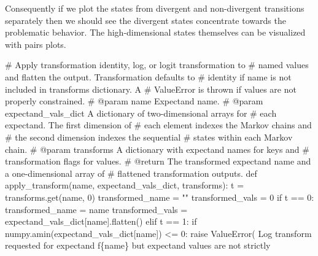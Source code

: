 \documentclass[
  letterpaper,
  DIV=11,
  numbers=noendperiod]{scrartcl}
\newenvironment{Shaded}{\begin{snugshade}}{\end{snugshade}}
\newcommand{\CommentTok}[1]{\textcolor[rgb]{0.37,0.37,0.37}{#1}}
\newcommand{\ControlFlowTok}[1]{\textcolor[rgb]{0.00,0.23,0.31}{#1}}
\newcommand{\DecValTok}[1]{\textcolor[rgb]{0.68,0.00,0.00}{#1}}
\newcommand{\KeywordTok}[1]{\textcolor[rgb]{0.00,0.23,0.31}{#1}}
\newcommand{\NormalTok}[1]{\textcolor[rgb]{0.00,0.23,0.31}{#1}}
\newcommand{\OperatorTok}[1]{\textcolor[rgb]{0.37,0.37,0.37}{#1}}
\newcommand{\PreprocessorTok}[1]{\textcolor[rgb]{0.68,0.00,0.00}{#1}}
\newcommand{\SpecialCharTok}[1]{\textcolor[rgb]{0.37,0.37,0.37}{#1}}
\newcommand{\SpecialStringTok}[1]{\textcolor[rgb]{0.13,0.47,0.30}{#1}}
\newcommand{\StringTok}[1]{\textcolor[rgb]{0.13,0.47,0.30}{#1}}
\begin{document}
Consequently if we plot the states from divergent and non-divergent
transitions separately then we should see the divergent states
concentrate towards the problematic behavior. The high-dimensional
states themselves can be visualized with pairs plots.

\begin{Shaded}
\begin{Highlighting}[]
\CommentTok{\# Apply transformation identity, log, or logit transformation to}
\CommentTok{\# named values and flatten the output.  Transformation defaults to}
\CommentTok{\# identity if name is not included in \textasciigrave{}transforms\textasciigrave{} dictionary.  A}
\CommentTok{\# ValueError is thrown if values are not properly constrained.}
\CommentTok{\# @param name Expectand name.}
\CommentTok{\# @param expectand\_vals\_dict A dictionary of two{-}dimensional arrays for}
\CommentTok{\#                            each expectand.  The first dimension of}
\CommentTok{\#                            each element indexes the Markov chains and}
\CommentTok{\#                            the second dimension indexes the sequential}
\CommentTok{\#                            states within each Markov chain.}
\CommentTok{\# @param transforms A dictionary with expectand names for keys and}
\CommentTok{\#                   transformation flags for values.}
\CommentTok{\# @return The transformed expectand name and a one{-}dimensional array of}
\CommentTok{\#         flattened transformation outputs.}
\KeywordTok{def}\NormalTok{ apply\_transform(name, expectand\_vals\_dict, transforms):}
\NormalTok{  t }\OperatorTok{=}\NormalTok{ transforms.get(name, }\DecValTok{0}\NormalTok{)}
\NormalTok{  transformed\_name }\OperatorTok{=} \StringTok{""}
\NormalTok{  transformed\_vals }\OperatorTok{=} \DecValTok{0}
  \ControlFlowTok{if}\NormalTok{ t }\OperatorTok{==} \DecValTok{0}\NormalTok{:}
\NormalTok{    transformed\_name }\OperatorTok{=}\NormalTok{ name}
\NormalTok{    transformed\_vals }\OperatorTok{=}\NormalTok{ expectand\_vals\_dict[name].flatten()}
  \ControlFlowTok{elif}\NormalTok{ t }\OperatorTok{==} \DecValTok{1}\NormalTok{:}
    \ControlFlowTok{if}\NormalTok{ numpy.amin(expectand\_vals\_dict[name]) }\OperatorTok{\textless{}=} \DecValTok{0}\NormalTok{:}
      \ControlFlowTok{raise} \PreprocessorTok{ValueError}\NormalTok{( }\StringTok{\textquotesingle{}Log transform requested for expectand \textquotesingle{}}
                       \SpecialStringTok{f\textquotesingle{}}\SpecialCharTok{\{}\NormalTok{name}\SpecialCharTok{\}}\SpecialStringTok{ but expectand values are not strictly \textquotesingle{}}

\end{Highlighting}
\end{Shaded}
\end{document}

